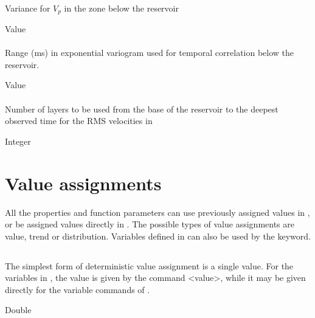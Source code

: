 {\paragraph{}
 \slist
   \item \Description Variance for $V_p$ in the zone below the reservoir
   \item \Argument Value
   \item \Default
 \elist

\paragraph{}
 \slist
   \item \Description Range (ms) in exponential variogram used for temporal correlation below the reservoir. 
   \item \Argument Value
   \item \Default
 \elist

\paragraph{}
 \slist
   \item \Description Number of layers to be used from the base of the reservoir to the deepest observed time for the RMS velocities in 
   \item \Argument Integer
   \item \Default
 \elist

\section{Value assignments}
\label{sec:valueassignment}
All the properties and function parameters can use previously assigned values in , or be assigned values directly in . The possible types of value assignments are value, trend or distribution. Variables defined in  can also be used by the  keyword.

\subsection{}
 \slist
   \item \Description The simplest form of deterministic value assignment is a single value. For the variables in , the value is given by the command <value>, while it may be given directly for the variable commands of . 
   \item \Argument Double
   \item \Default 
 \elist

}
